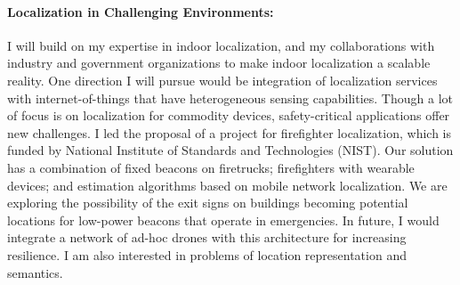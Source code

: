 \documentclass[10pt]{article}
\begin{document}
\paragraph{Localization in Challenging Environments: }
I will build on my expertise in indoor localization, and my collaborations with industry and government organizations to make indoor localization a scalable reality. One direction I will pursue would be integration of localization services with internet-of-things  that have heterogeneous sensing capabilities. Though a lot of focus is on localization for commodity devices, safety-critical applications offer new challenges. I led the proposal of a project for firefighter localization, which is funded by National Institute of Standards and Technologies (NIST). Our solution has a combination of fixed beacons on firetrucks; firefighters with wearable devices; and estimation algorithms based on mobile network localization. We are exploring the possibility of the exit signs on buildings becoming potential locations for low-power beacons that operate in emergencies. %
In future, I would integrate a network of ad-hoc drones with this architecture for increasing resilience. I am also interested in problems of location representation and semantics.\\  %

\end{document}
